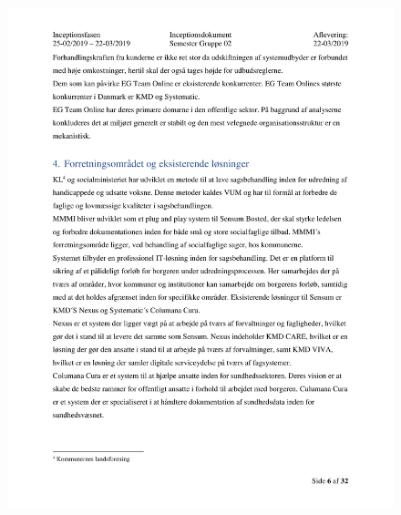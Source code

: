 \begin{figure}[hb]
  \includegraphics[scale = 0.33]{./PNG/Inceptions/Gruppe 02 + InceptionsDokument-07.jpg} 
\end{figure}

